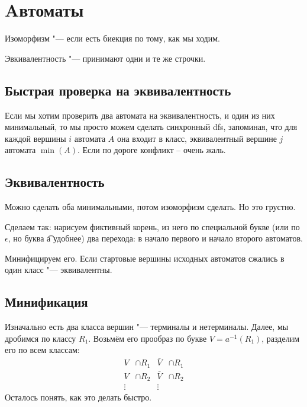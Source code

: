 \chapter{Aвтоматы}

\begin{Def}
	Изоморфизм "--- если есть биекция по тому, как мы ходим.
\end{Def}
\begin{Def}
	Эвкивалентность "--- принимают одни и те же строчки.
\end{Def}

\section{Быстрая проверка на эквивалентность}

Если мы хотим проверить два автомата на эквивалентность, и один из них минимальный, то мы просто можем сделать синхронный dfs, запоминая, что для каждой вершины $i$ автомата $A$ она входит в класс, эквивалентный вершине $j$ автомата $\min(A)$. Если по дороге конфликт -- очень жаль.

\section{Эквивалентность}

Можно сделать оба минимальными, потом изоморфизм сделать.
Но это грустно.

Сделаем так: нарисуем фиктивный корень, из него по специальной букве (или по $\epsilon$, но буква \t a удобнее) два перехода: в начало первого и начало второго автоматов.

Минифицируем его. Если стартовые вершины исходных автоматов сжались в один класс "--- эквивалентны.

\section{Минификация}

Изначально есть два класса вершин "--- терминалы и нетерминалы.
Далее, мы дробимся по классу $R_1$.
Возьмём его прообраз по букве $V = a^{-1}(R_1)$, разделим его по всем классам:
\begin{align*}
	V &\cap R_1 & \bar V &\cap R_1 \\
	V &\cap R_2 & \bar V &\cap R_2 \\
	\vdots && \vdots
\end{align*}
Осталось понять, как это делать быстро.

